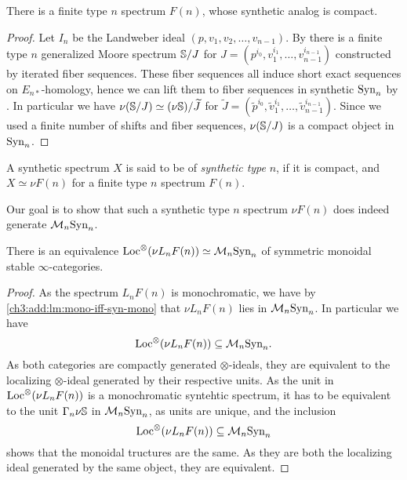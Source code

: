 \begin{lemma}
    There is a finite type $n$ spectrum $F(n)$, whose synthetic analog is compact. 
\end{lemma}
\begin{proof}
    Let $I_n$ be the Landweber ideal $(p,v_1, v_2, \ldots, v_{n-1})$. By \cite[4.14]{hovey-strickland_99} there is a finite type $n$ generalized Moore spectrum $\S/J$ for $J=(p^{i_0}, v_1^{i_1}, \ldots, v_{n-1}^{i_{n-1}})$ constructed by iterated fiber sequences. These fiber sequences all induce short exact sequences on $E_{n*}$-homology, hence we can lift them to fiber sequences in synthetic $\Syn_n$ by \cite[4.23]{pstragowski_2022}. In particular we have $\nu (\S/J) \simeq (\nu \S)/\widetilde{J}$ for $\widetilde{J} = (\widetilde{p}^{i_0}, \widetilde{v}_1^{i_1}, \ldots, \widetilde{v}_{n-1}^{i_{n-1}})$. Since we used a finite number of shifts and fiber sequences, $\nu (\S/J)$ is a compact object in $\Syn_n$. 
\end{proof}

\begin{definition}
    A synthetic spectrum $X$ is said to be of \emph{synthetic type} $n$, if it is compact, and $X\simeq \nu F(n)$ for a finite type $n$ spectrum $F(n)$. 
\end{definition}

Our goal is to show that such a synthetic type $n$ spectrum $\nu F(n)$ does indeed generate $\Mn \Syn_n$.

\begin{lemma}
    \label{ch3:add:monochromatic-synthetic-is-gen-by-type-n}
    There is an equivalence $\Loc^\otimes(\nu L_n F(n))\simeq \Mn\Syn_n$ of symmetric monoidal stable $\infty$-categories. 
\end{lemma}
\begin{proof}
    As the spectrum $L_n F(n)$ is monochromatic, we have by \cref{ch3:add:lm:mono-iff-syn-mono} that $\nu L_n F(n)$ lies in $\Mn\Syn_n$. In particular we have 
    \[\Loc^{\otimes}(\nu L_n F(n))\subseteq \Mn\Syn_n.\]
    As both categories are compactly generated $\otimes$-ideals, they are equivalent to the localizing $\otimes$-ideal generated by their respective units. As the unit in $\Loc^\otimes(\nu L_n F(n))$ is a monochromatic syntehtic spectrum, it has to be equivalent to the unit $\Gamma_n \nu \S$ in $\Mn\Syn_n$, as units are unique, and the inclusion
    \[\Loc^{\otimes}(\nu L_n F(n))\subseteq \Mn\Syn_n\] shows that the monoidal tructures are the same. As they are both the localizing ideal generated by the same object, they are equivalent. 
\end{proof}








